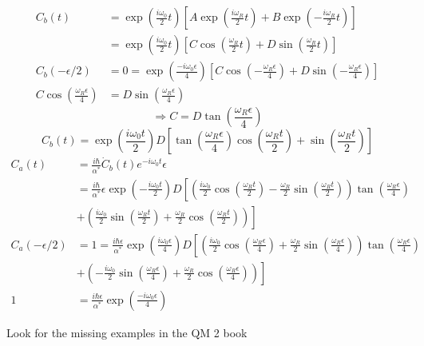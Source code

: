 \documentclass[12pt,fancychapters]{report}
\numberwithin{equation}{section}
\begin{document}
\begin{align*}
  C_b(t) &= \exp\left(\frac{i\omega_0}{2}t\right)\left[A\exp\left(\frac{i\omega_R}{2}t\right)
  + B\exp\left(-\frac{i\omega_R}{2}t\right)\right]\\
         &= \exp\left(\frac{i\omega_0}{2}t\right)\left[C\cos\left(\frac{\omega_R}{2}t\right)
         +D\sin\left(\frac{\omega_R}{2}t\right)\right]\\
    C_b(-\epsilon/2)&=0 = \exp\left(\frac{-i\omega_0\epsilon}{4}\right)\left[C\cos\left(
    -\frac{\omega_R\epsilon}{4}\right) +D\sin\left(-\frac{\omega_R\epsilon}{4}\right)\right]\\
  C\cos\left(\frac{\omega_R\epsilon}{4}\right) &= D\sin\left(\frac{\omega_R\epsilon}{4}\right)
\end{align*}
\[
  \Rightarrow C = D\tan\left(\frac{\omega_R\epsilon}{4}\right)
\]
\[
  C_b(t) = \exp\left(\frac{i\omega_0 t}{2}\right)D\left[\tan\left(\frac{\omega_R \epsilon}{4}
  \right)\cos\left(\frac{\omega_Rt}{2}\right)+\sin\left(\frac{\omega_R t}{2}\right)\right]
\]
\begin{align*}
  C_a(t) &= \frac{i\hbar}{\alpha^*}\dot{C}_b(t)e^{-i\omega_0 t}\epsilon\\
         &= \frac{i\hbar}{\alpha^*}\epsilon \exp\left(-\frac{i\omega_0 t}{2}\right)D\left[
         \left(\frac{i\omega_0}{2}
       \cos\left(\frac{\omega_R t}{2}\right)- \frac{\omega_R}{2}\sin\left(\frac{\omega_Rt}{2}
     \right)\right)\tan\left(\frac{\omega_R\epsilon}{4}\right)\right.\\
         &+\left. \left(\frac{i\omega_0}{2}\sin\left(\frac{\omega_Rt}{2}\right) +
         \frac{\omega_R}{2}\cos\left(\frac{\omega_R t}{2}\right)\right) \right]\\
  C_a(-\epsilon/2) &= 1 = \frac{i\hbar\epsilon}{\alpha^*}\exp\left(\frac{i\omega_0\epsilon}{4}
  \right)D\left[\left(\frac{i\omega_0}{2}\cos\left(\frac{\omega_R\epsilon}{4}\right)+
  \frac{\omega_R}{2}\sin\left(\frac{\omega_R \epsilon}{4}\right)\right)
\tan\left(\frac{\omega_R\epsilon}{4}\right)\right.\\
                   &\left. + \left(-\frac{i\omega_0}{2}\sin\left(\frac{\omega_R\epsilon}{4}\right)
                   + \frac{\omega_R}{2}\cos\left(\frac{\omega_R\epsilon}{4}\right)\right)\right]\\
    1&= \frac{i\hbar\epsilon}{\alpha^*}\exp\left(\frac{-i\omega_0 \epsilon}{4}\right)
    \end{align*}

Look for the missing examples in the QM 2 book
\end{document}
